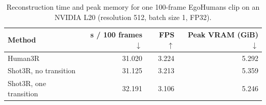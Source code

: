 \begin{table}[t]
  \centering
  \small
  \setlength{\tabcolsep}{4.2pt}
  \caption{Reconstruction time and peak memory for one 100-frame EgoHumans
  clip on an NVIDIA L20 (resolution 512, batch size 1, FP32).}
  \label{tab:standardized-runtime-memory}
  \begin{tabular}{lrrr}
    \toprule
    Method & s / 100 frames $\downarrow$ & FPS $\uparrow$ & Peak VRAM (GiB) $\downarrow$ \\
    \midrule
    Human3R & 31.020 & 3.224 & 5.292 \\
    Shot3R, no transition & 31.125 & 3.213 & 5.359 \\
    Shot3R, one transition & 32.191 & 3.106 & 5.246 \\
    \bottomrule
  \end{tabular}
\end{table}
